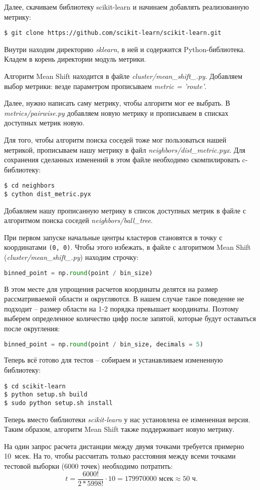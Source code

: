 Далее, скачиваем библиотеку scikit-learn и начинаем добавлять реализованную метрику:
\begin{lstlisting}
$ git clone https://github.com/scikit-learn/scikit-learn.git
\end{lstlisting}

Внутри находим директорию \emph{sklearn}, в ней и содержится Python-библиотека.
Кладем в корень директории модуль метрики.

Алгоритм Mean Shift находится в файле \emph{cluster/mean\_shift\_.py}.
Добавляем выбор метрики: везде параметром прописываем \emph{metric = 'route'}.

Далее, нужно написать саму метрику, чтобы алгоритм мог ее выбрать. В \emph{metrics/pairwise.py}
добавляем новую метрику и прописываем в списках доступных метрик новую.

Для того, чтобы алгоритм поиска соседей тоже мог пользоваться нашей метрикой, прописываем нашу
метрику в файл \emph{neighbors/dist\_metric.pyx}. Для сохранения сделанных изменений в этом файле
необходимо скомпилировать c-библиотеку:
\begin{lstlisting}
$ cd neighbors
$ cython dist_metric.pyx
\end{lstlisting}

Добавляем нашу прописанную метрику в список доступных метрик в файле с алгоритмом поиска соседей
\emph{neighbors/ball\_tree}.

При первом запуске начальные центры кластеров становятся в точку с координатами \texttt{(0, 0)}.
Чтобы этого избежать, в файле с алгоритмом Mean Shift (\emph{cluster/mean\_shift\_.py}) находим
строчку:
\begin{lstlisting}[language=Python]
binned_point = np.round(point / bin_size)
\end{lstlisting}

В этом месте для упрощения расчетов координаты делятся на размер рассматриваемой области
и округляются. В нашем случае такое поведение не подходит -- размер области на 1-2 порядка
превышает координаты. Поэтому выберем определенное количество цифр после запятой, которые будут
оставаться после округления:
\begin{lstlisting}[language=Python]
binned_point = np.round(point / bin_size, decimals = 5)
\end{lstlisting}

Теперь всё готово для тестов -- собираем и устанавливаем измененную библиотеку:
\begin{lstlisting}
$ cd scikit-learn
$ python setup.sh build
$ sudo python setup.sh install
\end{lstlisting}

Теперь вместо библиотеки \emph{scikit-learn} у нас установлена ее измененная версия.
Таким образом, алгоритм Mean Shift также поддерживает новую метрику.

На один запрос расчета дистанции между двумя точками требуется примерно 10~мсек.
На то, чтобы рассчитать только расстояния между всеми точками тестовой выборки (6000 точек)
необходимо потратить:
\[
    t = \frac{6000!}{2 * 5998!} \cdot 10 = 179970000\textrm{ мсек} \approx 50\textrm{ ч}.
\]
